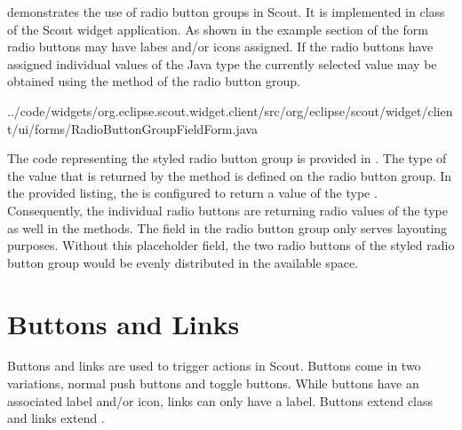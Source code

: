 \documentclass[a4paper,10pt,twoside]{book}
\begin{document}
 demonstrates the use of radio button groups in Scout. 
It is implemented in class  of the Scout widget application. 
As shown in the example section of the form radio buttons may have labes and/or icons assigned. 
If the radio buttons have assigned individual values of the Java type  the currently selected value may be obtained using the  method of the radio button group. 


{../code/widgets/org.eclipse.scout.widget.client/src/org/eclipse/scout/widget/client/ui/forms/RadioButtonGroupFieldForm.java}

The code representing the styled radio button group is provided in . 
The type of the value that is returned by the  method is defined on the radio button group. 
In the provided listing, the  is configured to return a value of the type . 
Consequently, the individual radio buttons are returning radio values of the type  as well in the  methods.
The field  in the radio button group only serves layouting purposes. 
Without this placeholder field, the two radio buttons of the styled radio button group would be evenly distributed in the available space. 

\section{Buttons and Links}

Buttons and links are used to trigger actions in Scout. 
Buttons come in two variations, normal push buttons and toggle buttons. 
While buttons have an associated label and/or icon, links can only have a label. 
Buttons extend class  and links extend . 
\end{document}

